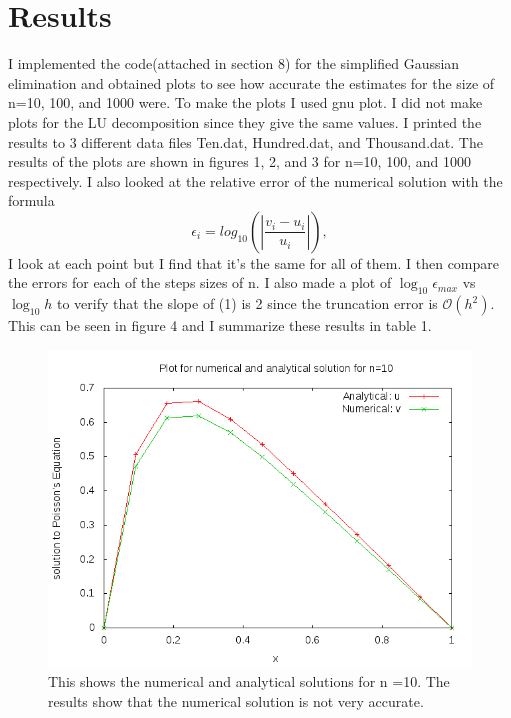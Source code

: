 \documentclass[11pt,a4wide]{article}
\begin{document}
\section{Results}
I implemented the code(attached in section 8) for the simplified Gaussian elimination and obtained plots to see how accurate the estimates for the size of n=10, 100, and 1000 were.  To make the plots I used gnu plot. I did not make plots for the LU decomposition since they give the same values. I printed the results to 3 different data files Ten.dat, Hundred.dat, and Thousand.dat. The results of the plots are shown in figures 1, 2, and 3 for n=10, 100, and 1000 respectively. I also looked at the relative error of the numerical solution with the formula 
\[
   \epsilon_i=log_{10}\left(\left|\frac{v_i-u_i}
                 {u_i}\right|\right),
\]
I look at each point but I find that it's the same for all of them. I then compare the errors for each of the steps sizes of n. I also made a plot of $\log_{10}{\epsilon_{max}}$ vs $\log_{10}{h}$ to verify that the slope of (1) is 2 since the truncation error is $\mathcal{O}(h^2)$. This can be seen in figure 4 and I summarize these results in table 1. 
\begin{figure}[H]
\centering
\includegraphics[width=120mm]{Ten.png}
\caption{This shows the numerical and analytical solutions for n =10. The results show that the numerical solution is not very accurate. \label{overflow}}
\end{figure}
\end{document}
